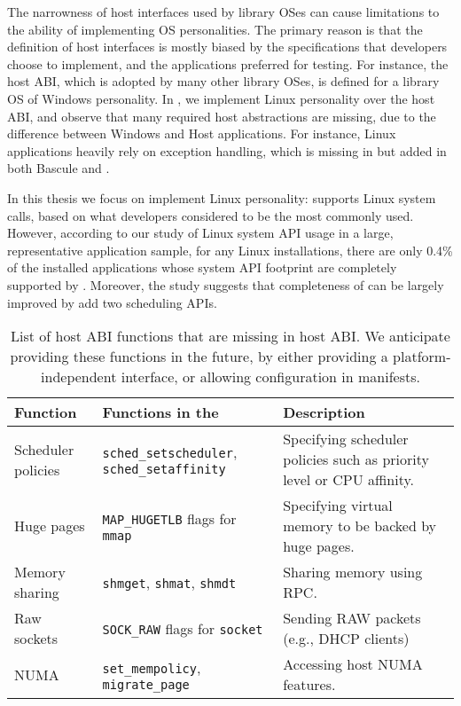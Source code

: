 The narrowness of host interfaces used by library OSes can cause limitations to the ability of implementing OS personalities.
The primary reason is that the definition of host interfaces
is mostly biased by the specifications that developers choose to implement,
and the applications preferred for testing.
For instance, the \drawbridge{} host ABI, which is adopted by many other library OSes,
is defined for a library OS of Windows personality.
In \graphene{}, we implement Linux personality over the \drawbridge{} host ABI,
and observe that many required host abstractions are missing,
due to the difference between Windows and Host applications.
For instance, Linux applications heavily rely on exception handling, which is missing in \drawbridge{} but added in both Bascule and \graphene{}.

In this thesis we focus on implement Linux personality:
\graphene{} supports \syscalls{} Linux system calls,
based on what developers considered to be the most commonly used.
However, according to our study of Linux system API usage in a large, representative application sample,
for any Linux installations,
there are only 0.4\% of the installed applications whose system API footprint
are completely supported by \graphene{}.
Moreover, the study suggests that completeness of \graphene{} can be largely improved by add two scheduling APIs.


\begin{table}[t]
\footnotesize
\centering
\begin{tabular}{|p{1.2in}|p{2.4in}|p{2.4in}|}
\hline
{\bf Function} & {\bf Functions in the \libos{}} & {\bf Description} \\
\hline
Scheduler policies & {\tt sched\_setscheduler}, {\tt sched\_setaffinity} & Specifying scheduler policies such as priority level or CPU affinity.\\
\hline
Huge pages & {\tt MAP\_HUGETLB} flags for {\tt mmap} & Specifying virtual memory to be backed by huge pages. \\
\hline
Memory sharing & {\tt shmget}, {\tt shmat}, {\tt shmdt} & Sharing memory using RPC. \\
\hline
Raw sockets & {\tt SOCK\_RAW} flags for {\tt socket} & Sending RAW packets (e.g., DHCP clients) \\
\hline
NUMA & {\tt set\_mempolicy}, {\tt migrate\_page} & Accessing host NUMA features. \\
\hline
\end{tabular}
\caption[List of host ABI functions to be added in \graphene{} as future works]
{List of host ABI functions that are missing in \graphene{} host ABI.
We anticipate providing these functions in the future,
by either providing a platform-independent interface,
or allowing configuration in manifests.}
\label{tab:future:abi}
\end{table}


